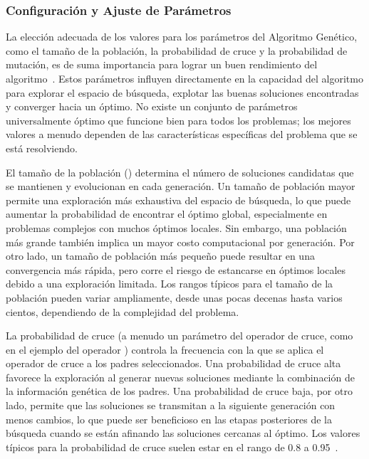 \subsubsection{Configuración y Ajuste de Parámetros}

La elección adecuada de los valores para los parámetros del Algoritmo Genético, como el tamaño de la población, la probabilidad de cruce y la probabilidad de mutación, es de suma importancia para lograr un buen rendimiento del algoritmo~\cite{eiben2015}. Estos parámetros influyen directamente en la capacidad del algoritmo para explorar el espacio de búsqueda, explotar las buenas soluciones encontradas y converger hacia un óptimo. No existe un conjunto de parámetros universalmente óptimo que funcione bien para todos los problemas; los mejores valores a menudo dependen de las características específicas del problema que se está resolviendo.

El tamaño de la población (\texttt{}) determina el número de soluciones candidatas que se mantienen y evolucionan en cada generación. Un tamaño de población mayor permite una exploración más exhaustiva del espacio de búsqueda, lo que puede aumentar la probabilidad de encontrar el óptimo global, especialmente en problemas complejos con muchos óptimos locales. Sin embargo, una población más grande también implica un mayor costo computacional por generación. Por otro lado, un tamaño de población más pequeño puede resultar en una convergencia más rápida, pero corre el riesgo de estancarse en óptimos locales debido a una exploración limitada. Los rangos típicos para el tamaño de la población pueden variar ampliamente, desde unas pocas decenas hasta varios cientos, dependiendo de la complejidad del problema.

La probabilidad de cruce (a menudo un parámetro del operador de cruce, como \texttt{} en el ejemplo del operador \texttt{}) controla la frecuencia con la que se aplica el operador de cruce a los padres seleccionados. Una probabilidad de cruce alta favorece la exploración al generar nuevas soluciones mediante la combinación de la información genética de los padres. Una probabilidad de cruce baja, por otro lado, permite que las soluciones se transmitan a la siguiente generación con menos cambios, lo que puede ser beneficioso en las etapas posteriores de la búsqueda cuando se están afinando las soluciones cercanas al óptimo. Los valores típicos para la probabilidad de cruce suelen estar en el rango de 0.8 a 0.95~\cite{eiben2015}.

